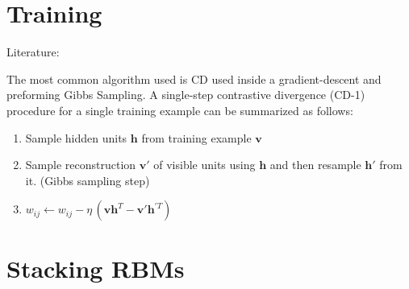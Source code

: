 \section{Training}
Literature: \cite{Hinton2012}


The most common algorithm used is \gls{CD} used inside a gradient-descent and preforming Gibbs Sampling. A single-step contrastive divergence (CD-1) procedure for a single training example can be summarized as follows:
\begin{enumerate}

\item Sample hidden units $\mathbf{h}$ from training example $\mathbf{v}$
\item Sample reconstruction $\mathbf{v}'$ of visible units using $\mathbf{h}$ and then resample $\mathbf{h}'$ from it. (Gibbs sampling step)
\item $w_{ij} \leftarrow w_{ij} - \eta\, (\mathbf{v} \mathbf{h}^T - \mathbf{v}' \mathbf{h}^{'T})$
\end{enumerate}

\section{Stacking RBMs}